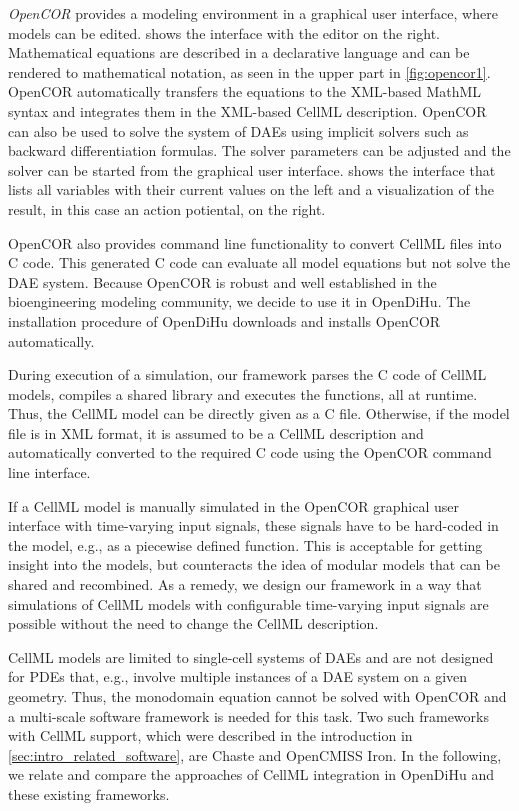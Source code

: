 \emph{OpenCOR} \cite{OpenCOR2015} provides a modeling environment in a graphical user interface, where models can be edited. 
 shows the interface with the editor on the right. Mathematical equations are described in a declarative language and can be rendered to mathematical notation, as seen in the upper part in \cref{fig:opencor1}. OpenCOR automatically transfers the equations to the XML-based MathML syntax and integrates them in the XML-based CellML description.
OpenCOR can also be used to solve the system of DAEs using implicit solvers such as backward differentiation formulas. The solver parameters can be adjusted and the solver can be started from the graphical user interface.  shows the interface that lists all variables with their current values on the left and a visualization of the result, in this case an action potiental, on the right.

OpenCOR also provides command line functionality to convert CellML files into C code. This generated C code can evaluate all model equations but not solve the DAE system. Because OpenCOR is robust and well established in the bioengineering modeling community, we decide to use it in OpenDiHu. The installation procedure of OpenDiHu downloads and installs OpenCOR automatically.

During execution of a simulation, our framework parses the C code of CellML models, compiles a shared library and executes the functions, all at runtime. Thus, the CellML model can be directly given as a C file. Otherwise, if the model file is in XML format, it is assumed to be a CellML description and automatically converted to the required C code using the OpenCOR command line interface.

If a CellML model is manually simulated in the OpenCOR graphical user interface with time-varying input signals, these signals have to be hard-coded in the model, e.g., as a piecewise defined function. This is acceptable for getting insight into the models, but counteracts the idea of modular models that can be shared and recombined. 
As a remedy, we design our framework in a way that simulations of CellML models with configurable time-varying input signals are possible without the need to change the CellML description.

CellML models are limited to single-cell systems of DAEs and are not designed for PDEs that, e.g., involve multiple instances of a DAE system on a given geometry. Thus, the monodomain equation cannot be solved with OpenCOR and a multi-scale software framework is needed for this task. Two such frameworks with CellML support, which were described in the introduction in \cref{sec:intro_related_software}, are Chaste and OpenCMISS Iron. In the following, we relate and compare the approaches of CellML integration in OpenDiHu and these existing frameworks.

